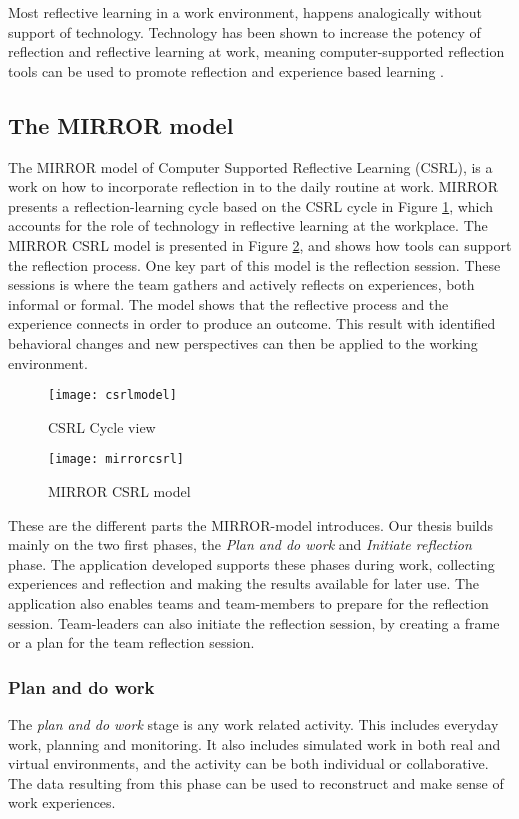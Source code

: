 Most reflective learning in a work environment, happens analogically without support of technology\citep{Schindler_Eppler_2003}. Technology has been shown to increase the potency of reflection and reflective learning at work, meaning computer-supported reflection tools can be used to promote reflection and experience based learning \citep{krogstiereflectionwork, Lin_Hmelo_Kinzer_Secules_1999,Xiao_Clark_Rosson_Carroll_2008}. 

\subsection{The MIRROR model}
\label{mirrorsection}
The MIRROR model of Computer Supported Reflective Learning (CSRL), is a work on how to incorporate reflection in to the daily routine at work. 
MIRROR presents a reflection-learning cycle based on the CSRL cycle in Figure \ref{csrlmodel}, which accounts for the role of technology in reflective learning at the workplace. The MIRROR CSRL model is presented in Figure \ref{mirrormodel}, and shows how tools can support the reflection process. One key part of this model is the reflection session. These sessions is where the team gathers and actively reflects on experiences, both informal or formal. The model shows that the reflective process and the experience connects in order to produce an outcome. This result with identified behavioral changes and new perspectives can then be applied to the working environment. 
\begin{figure}[!htpb]
\centering
	\texttt{[image: csrlmodel]}
\caption{CSRL Cycle view \citep{Krogstie2011}}
\label{csrlmodel}
\end{figure}

\begin{figure}[h!]
\centering
	\texttt{[image: mirrorcsrl]}
\caption{MIRROR CSRL model \citep{csrlmirror121}}
\label{mirrormodel}
\end{figure}

These are the different parts the MIRROR-model introduces. Our thesis builds mainly on the two first phases, the \emph{Plan and do work} and \emph{Initiate reflection} phase. The application developed supports these phases during work, collecting experiences and reflection and making the results available for later use. The application also enables teams and team-members to prepare for the reflection session. Team-leaders can also initiate the reflection session, by creating a frame or a plan for the team reflection session. 
\subsubsection{Plan and do work}
The \emph{plan and do work} stage is any work related activity. This includes everyday work, planning and monitoring. It also includes simulated work in both real and virtual environments, and the activity can be both individual or collaborative. The data resulting from this phase can be used to reconstruct and make sense of work experiences. 

